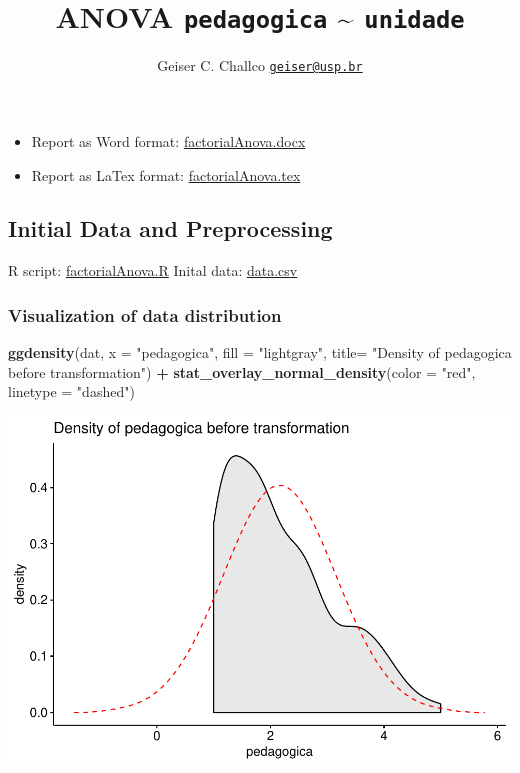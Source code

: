 \documentclass[]{article}
\title{ANOVA \texttt{pedagogica} \textasciitilde{} \texttt{unidade}}
\author{Geiser C. Challco \href{mailto:geiser@usp.br}{\nolinkurl{geiser@usp.br}}}
\date{}
\newenvironment{Shaded}{\begin{snugshade}}{\end{snugshade}}
\newcommand{\DataTypeTok}[1]{\textcolor[rgb]{0.13,0.29,0.53}{#1}}
\newcommand{\KeywordTok}[1]{\textcolor[rgb]{0.13,0.29,0.53}{\textbf{#1}}}
\newcommand{\NormalTok}[1]{#1}
\newcommand{\OperatorTok}[1]{\textcolor[rgb]{0.81,0.36,0.00}{\textbf{#1}}}
\newcommand{\StringTok}[1]{\textcolor[rgb]{0.31,0.60,0.02}{#1}}
\providecommand{\tightlist}{%
  \setlength{\itemsep}{0pt}\setlength{\parskip}{0pt}}
\begin{document}
\maketitle

\begin{itemize}
\tightlist
\item
  Report as Word format: \url{factorialAnova.docx}
\item
  Report as LaTex format: \url{factorialAnova.tex}
\end{itemize}

\hypertarget{initial-data-and-preprocessing}{%
\subsection{Initial Data and
Preprocessing}\label{initial-data-and-preprocessing}}

R script: \url{factorialAnova.R} Inital data: \url{data.csv}

\hypertarget{visualization-of-data-distribution}{%
\subsubsection{Visualization of data
distribution}\label{visualization-of-data-distribution}}

\begin{Shaded}
\begin{Highlighting}[]
\KeywordTok{ggdensity}\NormalTok{(dat, }\DataTypeTok{x =} \StringTok{"pedagogica"}\NormalTok{, }\DataTypeTok{fill =} \StringTok{"lightgray"}\NormalTok{, }\DataTypeTok{title=} \StringTok{"Density of pedagogica before transformation"}\NormalTok{) }\OperatorTok{+}
\StringTok{ }\KeywordTok{stat_overlay_normal_density}\NormalTok{(}\DataTypeTok{color =} \StringTok{"red"}\NormalTok{, }\DataTypeTok{linetype =} \StringTok{"dashed"}\NormalTok{)}
\end{Highlighting}
\end{Shaded}

\includegraphics{factorialAnova_files/figure-latex/unnamed-chunk-1-1.pdf}
\end{document}
